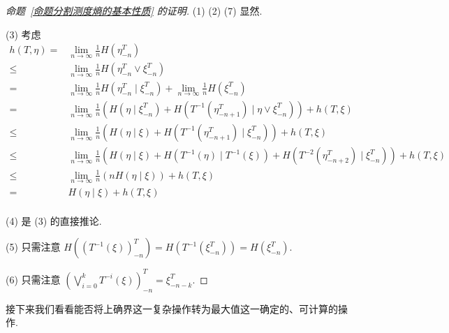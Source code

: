\documentclass[11pt, a4paper, oneside]{ctexart}
\begin{document}
    \begin{proof}[命题~\ref{命题分割测度熵的基本性质} 的证明]
        (1) (2) (7) 显然.

        (3) 考虑
        \begin{equation*}
            \begin{aligned}
                h(T,\eta)=&\lim\limits_{n\to\infty}\frac{1}{n}H(\eta^T_{-n})\\
                \leq&\lim\limits_{n\to\infty}\frac{1}{n}H(\eta^T_{-n}\vee \xi^T_{-n})\\
                =&\lim\limits_{n\to\infty}\frac{1}{n}H(\eta^T_{-n}\mid \xi^T_{-n})+\lim\limits_{n\to\infty}\frac{1}{n}H(\xi^T_{-n})\\
                =&\lim\limits_{n\to\infty}\frac{1}{n}(H(\eta\mid \xi^T_{-n})+H(T^{-1}(\eta_{-n+1}^T)\mid \eta\vee\xi^T_{-n}))+h(T,\xi)\\
                \leq &\lim\limits_{n\to\infty}\frac{1}{n}(H(\eta\mid \xi)+H(T^{-1}(\eta_{-n+1}^T)\mid \xi^T_{-n}))+h(T,\xi)\\
                \leq &\lim\limits_{n\to\infty}\frac{1}{n}(H(\eta\mid \xi)+H(T^{-1}(\eta)\mid T^{-1}(\xi))+H(T^{-2}(\eta_{-n+2}^T)\mid \xi^T_{-n}))+h(T,\xi)\\
                \leq &\lim\limits_{n\to\infty}\frac{1}{n}(nH(\eta\mid \xi))+h(T,\xi)\\
                =&H(\eta\mid \xi)+h(T,\xi)\\
            \end{aligned}
        \end{equation*}

        (4) 是 (3) 的直接推论.

        (5) 只需注意 $H({(T^{-1}(\xi))}_{-n}^{T})=H(T^{-1}(\xi_{-n}^T))=H(\xi_{-n}^T)$.

        (6) 只需注意 ${(\bigvee\limits_{i=0}^{k}T^{-i}(\xi))}_{-n}^T=\xi_{-n-k}^T$.
    \end{proof}

    接下来我们看看能否将上确界这一复杂操作转为最大值这一确定的、可计算的操作.
\end{document}
